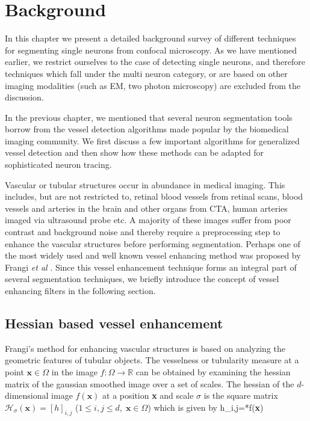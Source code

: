 
\chapter{Background} %

\label{Chapter2} %



In this chapter we present a detailed background survey of different techniques for segmenting single neurons from confocal microscopy. As we have mentioned earlier, we restrict ourselves to the case of detecting single neurons, and therefore techniques which fall under the multi neuron category, or are based on other imaging modalities (such as EM, two photon microscopy) are excluded from the discussion. 

In the previous chapter, we mentioned that several neuron segmentation tools borrow from the vessel detection algorithms made popular by the biomedical imaging community. We first discuss a few important algorithms for generalized vessel detection and then show how these methods can be adapted for sophisticated neuron tracing. 

Vascular or tubular structures occur in abundance in medical imaging. This includes, but are not restricted to, retinal blood vessels from retinal scans, blood vessels and arteries in the brain and other organs from CTA, human arteries imaged via ultrasound probe etc. A majority of these images suffer from poor contrast and background noise and thereby require a preprocessing step to enhance the vascular structures before performing segmentation. Perhaps one of the most widely used and well known vessel enhancing method was proposed by Frangi \textit{et al} \cite{frangi_vesselness}. Since this vessel enhancement technique forms an integral part of several segmentation techniques, we briefly introduce the concept of vessel enhancing filters in the following section.

\section{Hessian based vessel enhancement}
Frangi's \cite{frangi_vesselness} method for enhancing vascular structures is based on analyzing the geometric features of tubular objects. The vesselness or tubularity measure at a point $\textbf{x}\in \Omega$ in the image $f:\Omega \rightarrow \mathbb{R}$ can be obtained by examining the hessian matrix of the gaussian smoothed image over a set of scales. The hessian of the $d$-dimensional image $f(\textbf{x})$ at a position \textbf{x} and scale $\sigma$ is the square matrix $\mathcal{H}_{\sigma}(\textbf{x})=\left[ h \right]_{i,j} $ ($1\leq{i,j}\leq{d}, \; \textbf{x}\in\Omega$) which is given by
\bea
	 h_{i,j}=*f(\textbf{x})
\eea 

